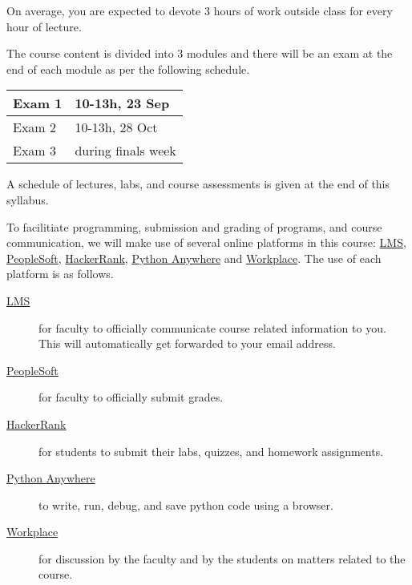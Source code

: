 \documentclass[a4paper]{article}
\begin{document}
On average, you are expected to devote 3 hours of work outside class for every hour of lecture.

The course content is divided into 3 modules and there will be an exam at the end of each module as per the following schedule.
\begin{tabular}{|l|l|}
  \hline
  Exam 1 & 10-13h, 23 Sep \\\hline
  Exam 2 & 10-13h, 28 Oct \\\hline
  Exam 3 & during finals week \\\hline
\end{tabular}

A schedule of lectures, labs, and course assessments is given at the end of this syllabus.

To facilitiate programming, submission and grading of programs, and course communication, we will make use of several online platforms in this course: \href{https://lms.habib.edu.pk}{LMS}, \href{https://pscs.habib.edu.pk/}{PeopleSoft}, \href{https://www.hackerrank.com/}{HackerRank}, \href{https://www.pythonanywhere.com}{Python Anywhere} and \href{https://habibedu.facebook.com/groups/1809008982742834/}{Workplace}. The use of each platform is as follows.
\begin{description}
\item [\href{https://lms.habib.edu.pk}{LMS}] for faculty to officially communicate course related information to you. This will automatically get forwarded to your email address.
\item [\href{https://pscs.habib.edu.pk/}{PeopleSoft}] for faculty to officially submit grades.
\item [\href{https://www.hackerrank.com/}{HackerRank}] for students to submit their labs, quizzes, and homework assignments.
\item[\href{https://www.pythonanywhere.com}{Python Anywhere}] to write, run, debug, and save python code using a browser.
\item [\href{https://habibedu.facebook.com/groups/1809008982742834/}{Workplace}] for discussion by the faculty and by the students on matters related to the course.
\end{description}
\end{document}
